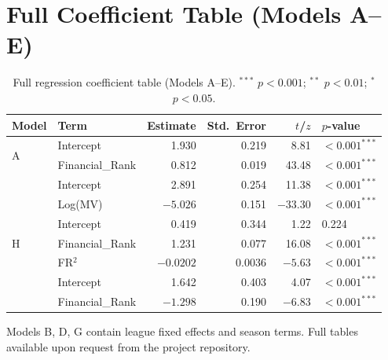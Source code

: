 \documentclass[11pt, a4paper]{article}
\begin{document}
\appendix

\section{Full Coefficient Table (Models A--E)}
\label{app:coeftable}

\begin{table}[H]
  \centering
  \small
  \caption{Full regression coefficient table (Models A--E). $^{***}$ $p<0.001$;
    $^{**}$ $p<0.01$; $^*$ $p<0.05$.}
  \label{tab:fullcoefs}
  \begin{tabular}{l l r r r l}
    \toprule
    \rowcolor{NavyBlue}
    \color{white}\textbf{Model} &
    \color{white}\textbf{Term} &
    \color{white}\textbf{Estimate} &
    \color{white}\textbf{Std.\ Error} &
    \color{white}\textbf{$t$/$z$} &
    \color{white}\textbf{$p$-value} \\
    \midrule
    \multirow{2}{*}{A} & Intercept & 1.930 & 0.219 & 8.81 & $< 0.001^{***}$ \\
                       & Financial\_Rank & 0.812 & 0.019 & 43.48 & $< 0.001^{***}$ \\
    \midrule
    \rowcolor{RowA}
    \multirow{2}{*}{C} & Intercept & 2.891 & 0.254 & 11.38 & $< 0.001^{***}$ \\
    \rowcolor{RowA}
                       & Log(MV) & $-5.026$ & 0.151 & $-33.30$ & $< 0.001^{***}$ \\
    \midrule
    \multirow{3}{*}{H} & Intercept & 0.419 & 0.344 & 1.22 & 0.224 \\
                       & Financial\_Rank & 1.231 & 0.077 & 16.08 & $< 0.001^{***}$ \\
                       & FR$^{2}$ & $-0.0202$ & 0.0036 & $-5.63$ & $< 0.001^{***}$ \\
    \midrule
    \rowcolor{RowA}
    \multirow{2}{*}{E\,(Logit)} & Intercept & 1.642 & 0.403 & 4.07 & $< 0.001^{***}$ \\
    \rowcolor{RowA}
                       & Financial\_Rank & $-1.298$ & 0.190 & $-6.83$ & $< 0.001^{***}$ \\
    \bottomrule
  \end{tabular}
  \medskip

  \noindent\small Models B, D, G contain league fixed effects and season terms.
  Full tables available upon request from the project repository.
\end{table}
\end{document}
